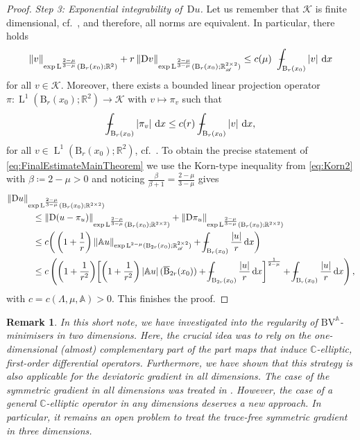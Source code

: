 \documentclass[a4paper,10pt,reqno,oneside]{amsart}
\numberwithin{equation}{section}
\newcommand{\R}{\mathbb R}
\newcommand{\C}{\mathbb C}
\newcommand{\ball}{\mathrm{B}}
\newcommand{\A}{\mathscr{A}}
\newcommand{\Aop}{\mathbb{A}}
\newcommand{\lebe}{\operatorname{L}}
\newcommand{\BV}{\mathrm{BV}}
\newcommand{\D}{\mathrm{D}}
\newcommand{\dx}[1]{\,\mathrm{d}#1}
\newcommand{\abs}[1]{\left\lvert#1\right\rvert}
\def\Xint#1{\mathchoice
	{\XXint\displaystyle\textstyle{#1}}%
	{\XXint\textstyle\scriptstyle{#1}}%
	{\XXint\scriptstyle\scriptscriptstyle{#1}}%
	{\XXint\scriptscriptstyle\scriptscriptstyle{#1}}%
	\!\int}
\def\XXint#1#2#3{{\setbox0=\hbox{$#1{#2#3}{\int}$ }
		\vcenter{\hbox{$#2#3$ }}\kern-.6\wd0}}
\def\dashint{\Xint-}
\newtheorem{rem}[thm]{Remark}
\begin{document}
\begin{proof}
	
	\textit{Step 3: Exponential integrability of \,$\D u$.} Let us remember that $\mathscr{K}$ is finite dimensional, cf.~, and therefore, all norms are equivalent. In particular, there holds
	\begin{equation*}
		\|v\|_{\exp\lebe^{\frac{2-\mu}{3-\mu}}(\ball_r(x_0);\R^2)} + r\,\|\D v\|_{\exp\lebe^{\frac{2-\mu}{3-\mu}}(\ball_r(x_0);\R^{2\times 2}_{\A})}\leq c(\mu)~~\dashint_{\ball_{r}(x_0)}\abs{v}\dx{x}
	\end{equation*}
	for all $v\in\mathscr{K}$. Moreover, there exists a bounded linear projection operator $\pi\colon \lebe^1(\ball_r(x_0);\R^2)\to \mathscr{K}$ with $v\mapsto \pi_v$ such that 
	\begin{equation*}
		\dashint_{\ball_{r}(x_0)} \abs{\pi_v}\dx{x} \leq c(r)~\dashint_{\ball_{r}(x_0)}\abs{v}\dx{x},
	\end{equation*}
	for all $v\in\lebe^1(\ball_{r}(x_0);\R^2)$, cf.~\cite[Appendix 9.1]{Gmeineder}. 
	To obtain the precise statement of \eqref{eq:FinalEstimateMainTheorem} we use the Korn-type inequality from \eqref{eq:Korn2} with $\beta\coloneqq 2-\mu>0$ and noticing $\tfrac{\beta}{\beta+1}= \tfrac{2-\mu}{3-\mu}$ gives
	\begin{align*}
		&\|\D u\|_{\exp\lebe^{\frac{2-\mu}{3-\mu}}(\ball_{r}(x_0);\R^{2\times 2})}\\
		&\hspace{1cm}\leq \|\D(u-\pi_u)\|_{\exp\lebe^{\frac{2-\mu}{3-\mu}}(\ball_{r}(x_0);\R^{2\times 2})} 
		+
		\|\D \pi_u\|_{\exp\lebe^{\frac{2-\mu}{3-\mu}}(\ball_{r}(x_0);\R^{2\times 2})}\notag\\
		&\hspace{1cm}\leq c\bigg(\left(1+\frac1r\right)\|\Aop u\|_{\exp\lebe^{2-\mu}(\ball_{2r}(x_0);\R^{2\times 2}_\A)} +  \dashint_{\ball_{r}(x_0)}\frac{\abs{u}}{r}\dx{x} \bigg)\\
		&\hspace{1cm}\leq c \left(\bigg(1+\frac{1}{r^2}\bigg)\bigg[\bigg(1+\frac{1}{r^2}\bigg) \abs{\Aop u}(\overline{\ball}_{2r}(x_0)) + \dashint_{\ball_{2r}(x_0)} \frac{\abs{u}}{r} \dx{x}\bigg]^{\frac{1}{2-\mu}} + \dashint_{\ball_{r}(x_0)} \frac{\abs{u}}{r}\dx{x}\right),
	\end{align*}
	with $c = c(\Lambda,\mu,\Aop)>0$.  This finishes the proof.

\end{proof}
\begin{rem}
 In this short note, we have investigated into the regularity of $\BV^\Aop$-minimisers in two dimensions. Here, the crucial idea was to rely on the one-dimensional (almost) complementary part of the part maps that induce $\C$-elliptic, first-order differential operators. Furthermore, we have shown that this strategy is also applicable for the deviatoric gradient in all dimensions. The case of the symmetric gradient in all dimensions was treated in \cite{BEG}. However, the case of a general $\C$-elliptic operator in any dimensions deserves a new approach. In particular, it remains an open problem to treat the trace-free symmetric gradient in three dimensions.
\end{rem}
\end{document}
